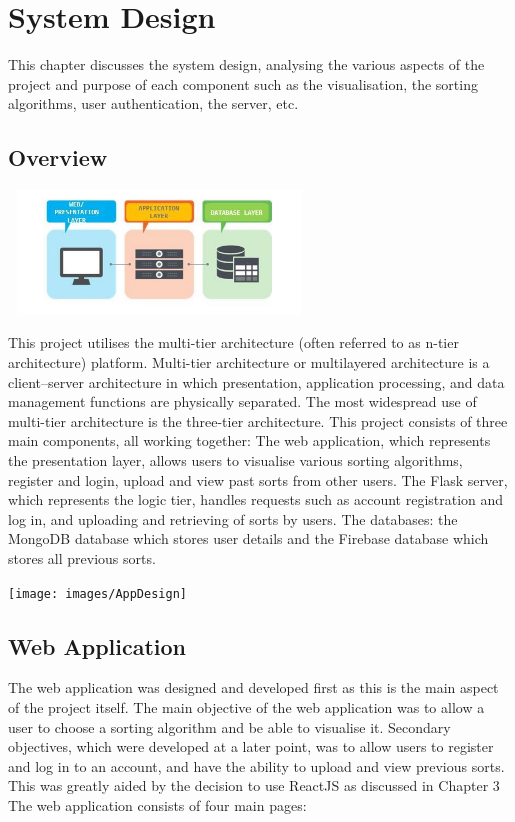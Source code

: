 \chapter{System Design}
This chapter discusses the system design, analysing the various aspects of the project and purpose of each component such as the visualisation, the sorting algorithms, user authentication, the server, etc.

\section{Overview}
\begin{center}
    \includegraphics[width=8cm,height=3.3cm,keepaspectratio]{images/3tier}
\end{center}

This project utilises the multi-tier architecture (often referred to as n-tier architecture) platform. Multi-tier architecture or multilayered architecture is a client–server architecture in which presentation, application processing, and data management functions are physically separated. The most widespread use of multi-tier architecture is the three-tier architecture. This project consists of three main components, all working together: The web application, which represents the presentation layer, allows users to visualise various sorting algorithms, register and login, upload and view past sorts from other users. The Flask server, which represents the logic tier, handles requests such as account registration and log in, and uploading and retrieving of sorts by users. The databases: the MongoDB database which stores user details and the Firebase database which stores all previous sorts.

\begin{center}
    \texttt{[image: images/AppDesign]}
\end{center}
\newpage

\section{Web Application}
The web application was designed and developed first as this is the main aspect of the project itself. The main objective of the web application was to allow a user to choose a sorting algorithm and be able to visualise it. Secondary objectives, which were developed at a later point, was to allow users to register and log in to an account, and have the ability to upload and view previous sorts. This was greatly aided by the decision to use ReactJS as discussed in Chapter 3 The web application consists of four main pages: 

